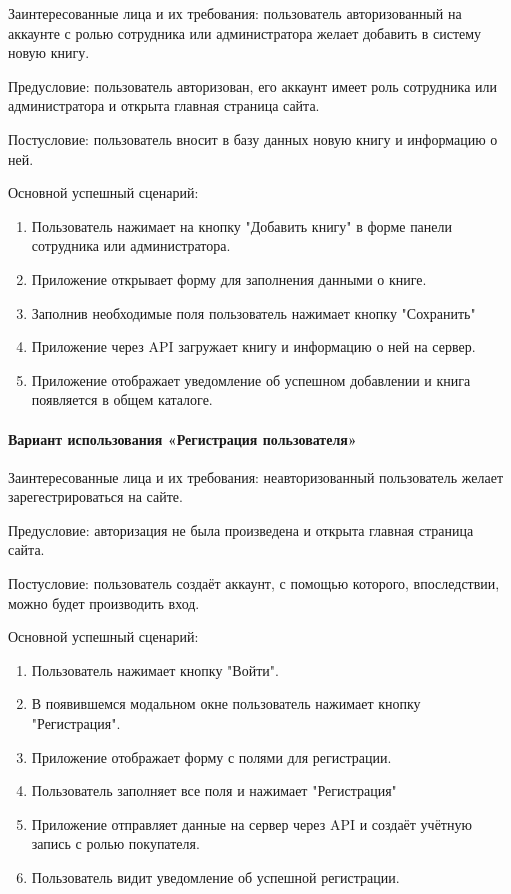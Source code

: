 Заинтересованные лица и их требования: пользователь авторизованный на аккаунте с ролью сотрудника или администратора желает добавить в систему новую книгу.

Предусловие: пользователь авторизован, его аккаунт имеет роль сотрудника или администратора и открыта главная страница сайта.

Постусловие: пользователь вносит в базу данных новую книгу и информацию о ней.

Основной успешный сценарий:

\begin{enumerate}
	\item Пользователь нажимает на кнопку "Добавить книгу" в форме панели сотрудника или администратора.
	\item Приложение открывает форму для заполнения данными о книге.
	\item Заполнив необходимые поля пользователь нажимает кнопку "Сохранить"
	\item Приложение через API загружает книгу и информацию о ней на сервер.
	\item Приложение отображает уведомление об успешном добавлении и книга появляется в общем каталоге.
\end{enumerate}

\paragraph{Вариант использования «Регистрация пользователя»}

Заинтересованные лица и их требования: неавторизованный пользователь желает зарегестрироваться на сайте.

Предусловие: авторизация не была произведена и открыта главная страница сайта.

Постусловие: пользователь создаёт аккаунт, с помощью которого, впоследствии, можно будет производить вход. 

Основной успешный сценарий:

\begin{enumerate}
	\item Пользователь нажимает кнопку "Войти".
	\item В появившемся модальном окне пользователь нажимает кнопку "Регистрация".
	\item Приложение отображает форму с полями для регистрации.
	\item Пользователь заполняет все поля и нажимает "Регистрация"
	\item Приложение отправляет данные на сервер через API и создаёт учётную запись с ролью покупателя.
	\item Пользователь видит уведомление об успешной регистрации.
\end{enumerate}


